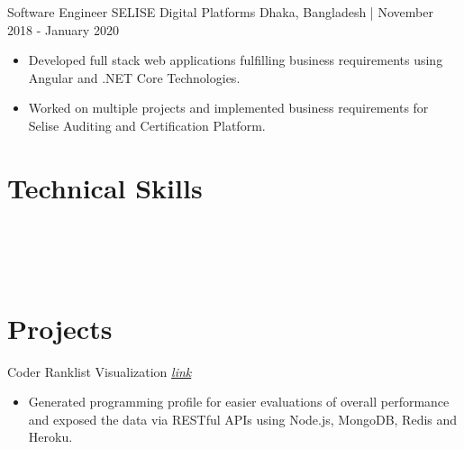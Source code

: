 \documentclass{resumestyle}
\begin{document}
    \vspace{4pt}%


    \worksubsection%
        {Software Engineer}%
        {SELISE Digital Platforms}%
        {Dhaka, Bangladesh | November 2018 - January 2020}%
    
    \begin{itemize}[labelsep=4pt,leftmargin=*,topsep=5pt,partopsep=0pt,itemsep=1pt]%
        \item Developed full stack web applications fulfilling business requirements using Angular and .NET Core Technologies.%
        \item Worked on multiple projects and implemented business requirements for Selise Auditing and Certification Platform.%
    \end{itemize}%

    \vspace{0pt}%

\section{Technical Skills}%
\enspace%
\enspace%
\enspace%
\thinspace\thinspace%
\vspace{4pt}\\%
\enspace%
\enspace%
\enspace%
\enspace%
\vspace{4pt}\\%
\thinspace\thinspace%
\thinspace\thinspace%
\enspace%
\enspace%
\vspace{4pt}\\%
\thinspace\thinspace%
\thinspace\thinspace%
\thinspace\thinspace%
\thinspace\thinspace%
%


\section{Projects}%
    
    \projectsubsection%
        {Coder Ranklist}%
        {Visualization \hfill \textit{\href{https://www.lus.ac.bd/cp__trashed/ranklist/}{\textcolor{link}{link}}}}%
    \begin{itemize}[labelsep=4pt,leftmargin=*,topsep=5pt,partopsep=0pt,itemsep=1pt]%
        \item Generated programming profile for easier evaluations of overall performance and exposed the data via RESTful APIs using Node.js, MongoDB, Redis and Heroku.
    \end{itemize}%
\end{document}
